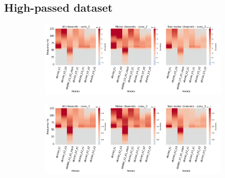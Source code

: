 \clearpage
\subsection*{High-passed dataset}\label{subsec:absVel-high-passed-dataset-appendixD}
\begin{figure}[!htpb]
\centering
\begin{subfigure}[b]{\textwidth}
   \includegraphics[width=1\linewidth]{img/appendix/D/conv-2/hp-m/absVel_model_gradients_all_kinds}
   \caption{}
   \label{fig:absVel-pw-hp-grads-conv-2}
\end{subfigure}

\begin{subfigure}[b]{\textwidth}
   \includegraphics[width=1\linewidth]{img/appendix/D/conv-3/hp-m/absVel_model_gradients_all_kinds}
   \caption{}
   \label{fig:absVel-pw-hp-grads-conv-3}
\end{subfigure}
\end{figure}
\clearpage   

